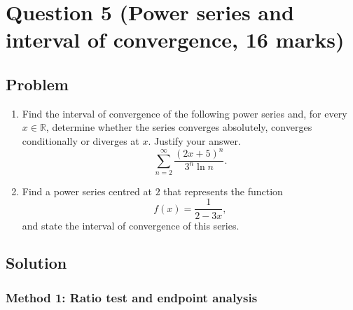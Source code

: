 \documentclass[12pt]{article}
\newcommand{\R}{\mathbb{R}}
\begin{document}
\newpage
\section{Question 5 (Power series and interval of convergence, 16 marks)}

\subsection{Problem}

\begin{enumerate}[label=(\alph*)]
\item Find the interval of convergence of the following power series and, for every $x\in\R$, determine whether the series converges absolutely, converges conditionally or diverges at $x$. Justify your answer.
\[
\sum_{n=2}^{\infty}\frac{(2x+5)^n}{3^n\ln n}.
\]

\item Find a power series centred at $2$ that represents the function
\[
f(x)=\frac1{2-3x},
\]
and state the interval of convergence of this series.
\end{enumerate}

\newpage
\subsection{Solution}

\subsubsection{Method 1: Ratio test and endpoint analysis}
\end{document}
